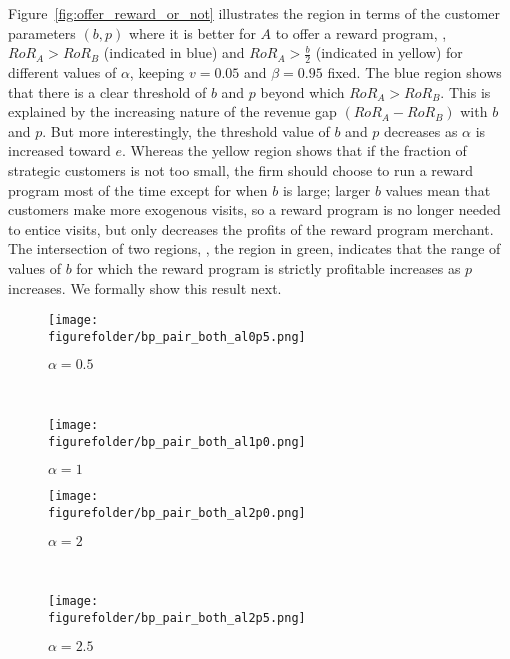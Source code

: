 Figure~\ref{fig:offer_reward_or_not} illustrates the region in terms of the customer parameters $(b,p)$ where it is better for $A$ to offer a reward program, \ie, $RoR_A > RoR_B$ (indicated in blue) and $RoR_A > \frac{b}{2}$ (indicated in yellow) for different values of $\alpha$, keeping $v = 0.05$ and $\beta = 0.95$ fixed.
The blue region shows that there is a clear threshold of $b$ and $p$ beyond which $RoR_A > RoR_B$.
This is explained by the increasing nature of the revenue gap $(RoR_A - RoR_B)$ with $b$ and $p$.
But more interestingly, the threshold value of $b$ and $p$ decreases as $\alpha$ is increased toward $e$.
Whereas the yellow region shows that if the fraction of strategic customers is not too small, the firm should choose to run a reward program most of the time except for when $b$ is large; larger $b$ values mean that customers make more exogenous visits, so a reward program is no longer needed to entice visits, but only decreases the profits of the reward program merchant.
The intersection of two regions, \ie, the region in green, indicates that the range of values of $b$ for which the reward program is strictly profitable increases as $p$ increases.
We formally show this result next.

\begin{figure*}[t!]
\centering
\begin{subfigure}[t]{0.5\textwidth}
\centering
\texttt{[image: \\figurefolder/bp\_pair\_both\_al0p5.png]}
\caption{$\alpha = 0.5$}
\end{subfigure}%
~ 
\begin{subfigure}[t]{0.5\textwidth}
\centering
\texttt{[image: \\figurefolder/bp\_pair\_both\_al1p0.png]}
\caption{$\alpha = 1$}
\end{subfigure}
\centering
\begin{subfigure}[t]{0.5\textwidth}
\centering
\texttt{[image: \\figurefolder/bp\_pair\_both\_al2p0.png]}
\caption{$\alpha = 2$}
\end{subfigure}%
~ 
\begin{subfigure}[t]{0.5\textwidth}
\centering
\texttt{[image: \\figurefolder/bp\_pair\_both\_al2p5.png]}
\caption{$\alpha = 2.5$}
\end{subfigure}

\caption{{Regions where $RoR_A > RoR_B$ (blue), where $RoR_A > \frac{b}{2}$ (yellow) and where both are true (green) for different values of $\alpha$. In all cases, $\beta = 0.95$ and $v = 0.05$.}}
\label{fig:offer_reward_or_not}
\end{figure*}

